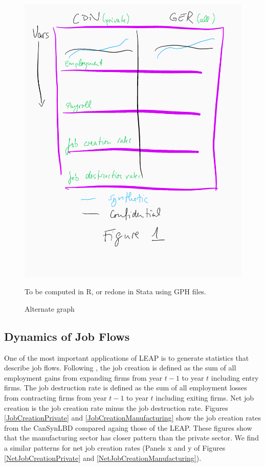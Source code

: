 \begin{figure} [H]
\centering
\label{tab:all:characteristics}
\includegraphics[width=.8\linewidth]{graphs/Figure1-placeholder.png} 
\caption{Alternate graph} 
\begin{minipage}{0.48\linewidth}
{\footnotesize To be computed in R, or redone in Stata using GPH files. \par}
\end{minipage}
\end{figure}


\subsection{Dynamics of Job Flows}

One of the most important applications of LEAP is to generate statistics that describe job flows. Following \cite{DavisHaltiwangerSchuh}, the job creation is defined as the sum of all employment gains from expanding firms from year $t-1$ to year $t$ including entry firms. The job destruction rate is defined as the sum of all employment losses from contracting firms from year $t-1$ to year $t$ including exiting firms. Net job creation is the job creation rate minus the job destruction rate. Figures \ref{JobCreationPrivate} and \ref{JobCreationManufacturing} show the job creation rates from the CanSynLBD compared againg those of the LEAP. These figures show that the manufacturing sector has closer pattern than the private sector. We find a similar patterns for net job creation rates (Panels x and y of Figures \ref{NetJobCreationPrivate} and  \ref{NetJobCreationManufacturing}).


